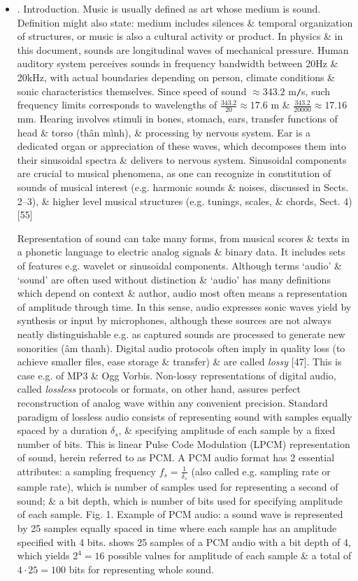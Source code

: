 \documentclass{article}
\begin{document}
\begin{itemize}
	\item {. Introduction.} Music is usually defined as art whose medium is sound. Definition might also state: medium includes silences \& temporal organization of structures, or music is also a cultural activity or product. In physics \& in this document, sounds are longitudinal waves of mechanical pressure. Human auditory system perceives sounds in frequency bandwidth between 20Hz \& 20kHz, with actual boundaries depending on person, climate conditions \& sonic characteristics themselves. Since speed of sound $\approx343.2$ m{\tt/}s, such frequency limits corresponds to wavelengths of $\frac{343.2}{20}\approx17.6$ m \& $\frac{343.2}{20000}\approx17.16$ mm. Hearing involves stimuli in bones, stomach, ears, transfer functions of head \& torso (thân mình), \& processing by nervous system. Ear is a dedicated organ or appreciation of these waves, which decomposes them into their sinusoidal spectra \& delivers to nervous system. Sinusoidal components are crucial to musical phenomena, as one can recognize in constitution of sounds of musical interest (e.g. harmonic sounds \& noises, discussed in Sects. 2--3), \& higher level musical structures (e.g. tunings, scales, \& chords, Sect. 4) [55]
	
	Representation of sound can take many forms, from musical scores \& texts in a phonetic language to electric analog signals \& binary data. It includes sets of features e.g. wavelet or sinusoidal components. Although terms `audio' \& `sound' are often used without distinction \& `audio' has many definitions which depend on context \& author, audio most often means a representation of amplitude through time. In this sense, audio expresses sonic waves yield by synthesis or input by microphones, although these sources are not always neatly distinguishable e.g. as captured sounds are processed to generate new sonorities (âm thanh). Digital audio protocols often imply in quality loss (to achieve smaller files, ease storage \& transfer) \& are called {\it lossy} [47]. This is case e.g. of MP3 \& Ogg Vorbis. Non-lossy representations of digital audio, called {\it lossless} protocols or formats, on other hand, assures perfect reconstruction of analog wave within any convenient precision. Standard paradigm of lossless audio consists of representing sound with samples equally spaced by a duration $\delta_s$, \& specifying amplitude of each sample by a fixed number of bits. This is linear Pulse Code Modulation (LPCM) representation of sound, herein referred to as PCM. A PCM audio format has 2 essential attributes: a sampling frequency $f_s = \frac{1}{\delta_s}$ (also called e.g. sampling rate or sample rate), which is number of samples used for representing a second of sound; \& a bit depth, which is number of bits used for specifying amplitude of each sample. {\sf Fig. 1. Example of PCM audio: a sound wave is represented by 25 samples equally spaced in time where each sample has an amplitude specified with 4 bits.} shows 25 samples of a PCM audio with a bit depth of 4, which yields $2^4 = 16$ possible values for amplitude of each sample \& a total of $4\cdot25 = 100$ bits for representing whole sound.
	

\end{itemize}
\end{document}
